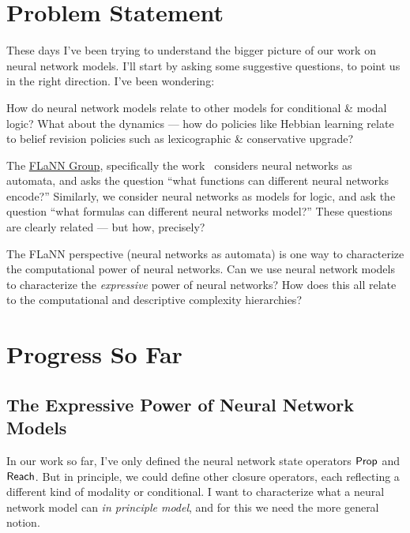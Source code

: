 \documentclass[letterpaper]{article}
\begin{document}
\section*{Problem Statement}

These days I've been trying to understand the bigger picture of our work on neural network models.  I'll start by asking some suggestive questions, to point us in the right direction. I've been wondering:

\begin{question}
    How do neural network models relate to other models for conditional \& modal logic?  What about the dynamics --- how do policies like Hebbian learning relate to belief revision policies such as lexicographic \& conservative upgrade?
\end{question}

\begin{question}
    The \href{http://flann.super.site/}{FLaNN Group}, specifically the work~\cite{merrill2019sequential,merrill2020formal,strobl2024formal} considers neural networks as automata, and asks the question ``what functions can different neural networks encode?''  Similarly, we consider neural networks as models for logic, and ask the question ``what formulas can different neural networks model?''  These questions are clearly related --- but how, precisely?
\end{question}

\begin{question}
    The FLaNN perspective (neural networks as automata) is one way to characterize the computational power of neural networks.  Can we use neural network models to characterize the \emph{expressive} power of neural networks?  How does this all relate to the computational and descriptive complexity hierarchies?
\end{question}

\section*{Progress So Far}

\subsection*{The Expressive Power of Neural Network Models}

In our work \cite{kisby2024hebbian} so far, I've only defined the neural network state operators $\mathsf{Prop}$ and $\mathsf{Reach}$.  But in principle, we could define other closure operators, each reflecting a different kind of modality or conditional.  I want to characterize what a neural network model can \emph{in principle model}, and for this we need the more general notion.
\end{document}
